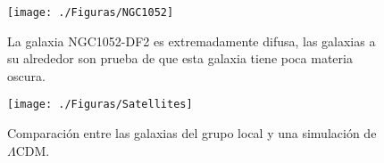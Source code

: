 \documentclass[a4paper,openright,10pt, oneside, final]{book}
\begin{document}
\begin{figure}[htp]
\centering
\texttt{[image: ./Figuras/NGC1052]}
\caption{\footnotesize{La galaxia NGC1052-DF2 es extremadamente difusa, las galaxias a su alrededor son prueba de que esta galaxia tiene poca materia oscura.}}\label{fig 1.11}
\end{figure}

\begin{figure}[hbp]
\centering
 \texttt{[image: ./Figuras/Satellites]}
 \caption{\footnotesize{Comparación entre las galaxias del grupo local y una simulación de $\Lambda$CDM.}}
\end{figure}




\end{document}
